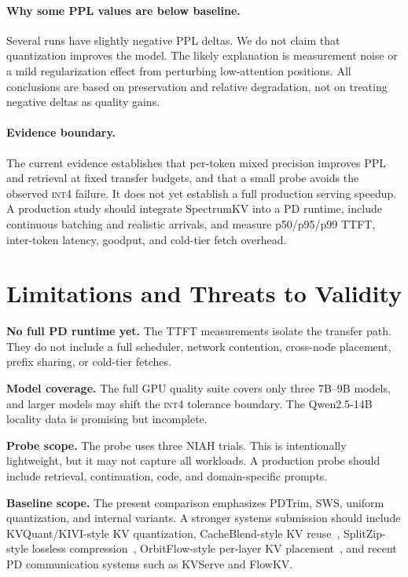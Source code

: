\documentclass[11pt]{article}
\newcommand{\method}{SpectrumKV}
\newcommand{\niah}{NIAH}
\newcommand{\intiv}{\textsc{int4}}
\theoremstyle{plain}
\theoremstyle{definition}
\begin{document}
\paragraph{Why some PPL values are below baseline.}
Several runs have slightly negative PPL deltas.  We do not claim that quantization improves the model.  The likely explanation is measurement noise or a mild regularization effect from perturbing low-attention positions.  All conclusions are based on preservation and relative degradation, not on treating negative deltas as quality gains.

\paragraph{Evidence boundary.}
The current evidence establishes that per-token mixed precision improves PPL and retrieval at fixed transfer budgets, and that a small probe avoids the observed \intiv{} failure.  It does not yet establish a full production serving speedup.  A production study should integrate \method{} into a PD runtime, include continuous batching and realistic arrivals, and measure p50/p95/p99 TTFT, inter-token latency, goodput, and cold-tier fetch overhead.

\section{Limitations and Threats to Validity}
\label{sec:limitations}

\textbf{No full PD runtime yet.}  The TTFT measurements isolate the transfer path.  They do not include a full scheduler, network contention, cross-node placement, prefix sharing, or cold-tier fetches.

\textbf{Model coverage.}  The full GPU quality suite covers only three 7B--9B models, and larger models may shift the \intiv{} tolerance boundary.  The Qwen2.5-14B locality data is promising but incomplete.

\textbf{Probe scope.}  The probe uses three \niah{} trials.  This is intentionally lightweight, but it may not capture all workloads.  A production probe should include retrieval, continuation, code, and domain-specific prompts.

\textbf{Baseline scope.}  The present comparison emphasizes PDTrim, SWS, uniform quantization, and internal variants.  A stronger systems submission should include KVQuant/KIVI-style KV quantization, CacheBlend-style KV reuse~\citep{cacheblend}, SplitZip-style lossless compression~\citep{splitzip}, OrbitFlow-style per-layer KV placement~\citep{orbitflow}, and recent PD communication systems such as KVServe and FlowKV.
\end{document}
